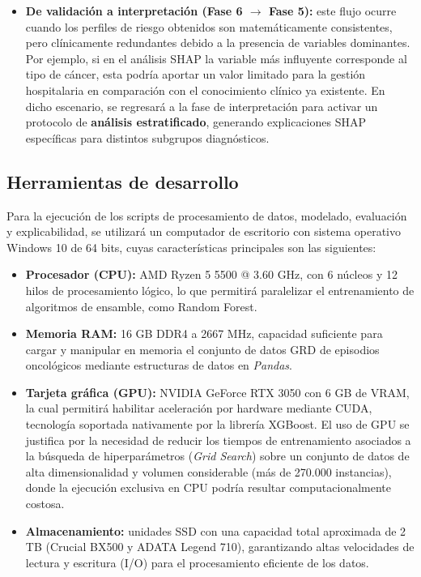 \begin{itemize}
\item \textbf{De validación a interpretación (Fase 6 $\rightarrow$ Fase 5):} este flujo ocurre cuando los perfiles de riesgo obtenidos son matemáticamente consistentes, pero clínicamente redundantes debido a la presencia de variables dominantes. Por ejemplo, si en el análisis SHAP la variable más influyente corresponde al tipo de cáncer, esta podría aportar un valor limitado para la gestión hospitalaria en comparación con el conocimiento clínico ya existente. En dicho escenario, se regresará a la fase de interpretación para activar un protocolo de \textbf{análisis estratificado}, generando explicaciones SHAP específicas para distintos subgrupos diagnósticos.

\end{itemize}


\subsection{Herramientas de desarrollo}
Para la ejecución de los scripts de procesamiento de datos, modelado, evaluación y explicabilidad, se utilizará un computador de escritorio con sistema operativo Windows 10 de 64 bits, cuyas características principales son las siguientes:
\begin{itemize}

\item \textbf{Procesador (CPU):} AMD Ryzen 5 5500 @ 3.60 GHz, con 6 núcleos y 12 hilos de procesamiento lógico, lo que permitirá paralelizar el entrenamiento de algoritmos de ensamble, como Random Forest.

\item \textbf{Memoria RAM:} 16 GB DDR4 a 2667 MHz, capacidad suficiente para cargar y manipular en memoria el conjunto de datos GRD de episodios oncológicos mediante estructuras de datos en \textit{Pandas}.

\item \textbf{Tarjeta gráfica (GPU):} NVIDIA GeForce RTX 3050 con 6 GB de VRAM, la cual permitirá habilitar aceleración por hardware mediante CUDA, tecnología soportada nativamente por la librería XGBoost. El uso de GPU se justifica por la necesidad de reducir los tiempos de entrenamiento asociados a la búsqueda de hiperparámetros (\textit{Grid Search}) sobre un conjunto de datos de alta dimensionalidad y volumen considerable (más de 270.000 instancias), donde la ejecución exclusiva en CPU podría resultar computacionalmente costosa.

\item \textbf{Almacenamiento:} unidades SSD con una capacidad total aproximada de 2 TB (Crucial BX500 y ADATA Legend 710), garantizando altas velocidades de lectura y escritura (I/O) para el procesamiento eficiente de los datos.

\end{itemize}



